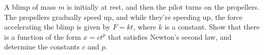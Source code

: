 A blimp of mass $m$ is initially at rest, and then
the pilot turns on the propellers. The propellers gradually
speed up, and while they're speeding up, the force accelerating
the blimp is given by $F=kt$, where $k$ is a constant.
Show that there is a function of the form $x=ct^p$ that
satisfies Newton's second law, and determine the constants
$c$ and $p$.\answercheck\hwendpart
